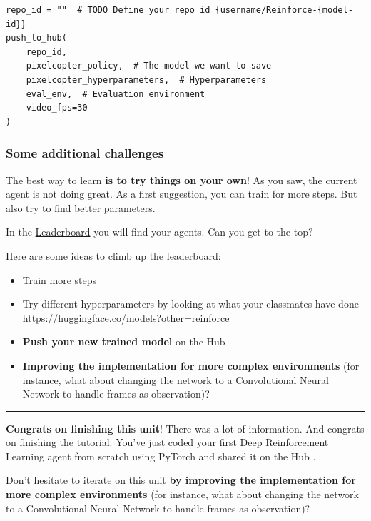 \documentclass[11pt,a4paper]{article}
\begin{document}
\begin{lstlisting}
repo_id = ""  # TODO Define your repo id {username/Reinforce-{model-id}}
push_to_hub(
    repo_id,
    pixelcopter_policy,  # The model we want to save
    pixelcopter_hyperparameters,  # Hyperparameters
    eval_env,  # Evaluation environment
    video_fps=30
)
\end{lstlisting}

\subsubsection{Some additional challenges}\label{some-additional-challenges}

The best way to learn \textbf{is to try things on your own}! As you saw, the current agent is not doing great. As a first suggestion, you can train for more steps. But also try to find better parameters.

In the \href{https://huggingface.co/spaces/huggingface-projects/Deep-Reinforcement-Learning-Leaderboard}{Leaderboard} you will find your agents. Can you get to the top?

Here are some ideas to climb up the leaderboard:

\begin{itemize}
\tightlist
\item
  Train more steps
\item
  Try different hyperparameters by looking at what your classmates have done \url{https://huggingface.co/models?other=reinforce}
\item
  \textbf{Push your new trained model} on the Hub
\item
  \textbf{Improving the implementation for more complex environments} (for instance, what about changing the network to a Convolutional Neural Network to handle frames as observation)?
\end{itemize}

\begin{center}\rule{0.5\linewidth}{0.5pt}\end{center}

\textbf{Congrats on finishing this unit}! There was a lot of information. And congrats on finishing the tutorial. You've just coded your first Deep Reinforcement Learning agent from scratch using PyTorch and shared it on the Hub .

Don't hesitate to iterate on this unit \textbf{by improving the implementation for more complex environments} (for instance, what about changing the network to a Convolutional Neural Network to handle frames as observation)?
\end{document}
